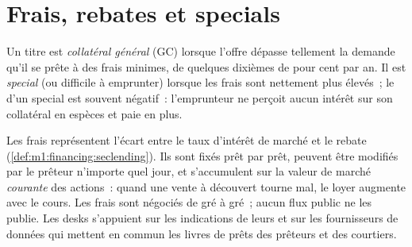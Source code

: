 \section{Frais, rebates et specials}

\begin{definition}\label{def:m1:stock-loan-and-short-selling:special}
Un titre est \emph{collatéral général} (GC) lorsque l'offre
dépasse tellement la demande qu'il se prête à des frais minimes, de quelques dixièmes de pour cent
par an. Il est \emph{special} (ou difficile à emprunter) lorsque les frais sont
nettement plus élevés~; le  d'un special est souvent négatif~: l'emprunteur
ne perçoit aucun intérêt sur son collatéral en espèces et paie en plus.
\end{definition}

Les frais représentent l'écart entre le taux d'intérêt de marché et le rebate
(\cref{def:m1:financing:seclending}). Ils sont fixés prêt par prêt, peuvent être modifiés
par le prêteur n'importe quel jour, et s'accumulent sur la valeur de marché \emph{courante} des
actions~: quand une vente à découvert tourne mal, le loyer augmente avec le cours. Les frais sont
négociés de gré à gré~; aucun flux public ne les publie. Les desks s'appuient sur les indications de leurs  et sur les fournisseurs de données qui mettent en commun les livres de prêts des
prêteurs et des courtiers.

\begin{omfigure}

\label{fig:m1:stock-loan-and-short-selling:fee}
\end{omfigure}

